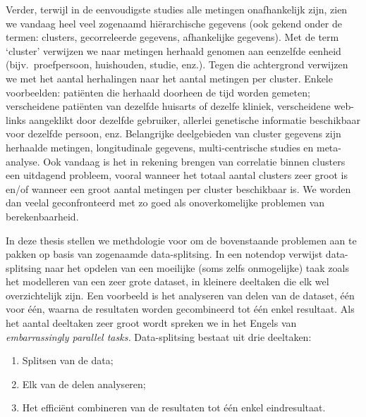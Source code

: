 \documentclass[14pt]{article}
\begin{document}
\begin{sloppypar}
Verder, terwijl in de eenvoudigste studies alle metingen onafhankelijk zijn, zien we vandaag heel veel zogenaamd hi\"erarchische gegevens (ook gekend onder de termen: clusters, gecorreleerde gegevens, afhankelijke gegevens). Met de term `cluster' verwijzen we naar metingen herhaald genomen aan eenzelfde eenheid (bijv.\ proefpersoon, huishouden, studie, enz.). Tegen die achtergrond verwijzen we met het aantal herhalingen naar het aantal metingen per cluster. Enkele voorbeelden: pati\"enten die herhaald doorheen de tijd worden gemeten; verscheidene pati\"enten van dezelfde huisarts of dezelfe kliniek, verscheidene web-links aangeklikt door dezelfde gebruiker, allerlei genetische informatie beschikbaar voor dezelfde persoon, enz. Belangrijke deelgebieden van cluster gegevens zijn herhaalde metingen, longitudinale gegevens, multi-centrische studies en meta-analyse. Ook vandaag is het in rekening brengen van correlatie binnen clusters een uitdagend probleem, vooral wanneer het totaal aantal clusters zeer groot is en/of wanneer een groot aantal metingen per cluster beschikbaar is. We worden dan veelal geconfronteerd met zo goed als onoverkomelijke problemen van berekenbaarheid. 
\end{sloppypar}

\begin{sloppypar}
In deze thesis stellen we methdologie voor om de bovenstaande problemen aan te pakken op basis van zogenaamde data-splitsing. In een notendop verwijst data-splitsing naar het opdelen van een moeilijke (soms zelfs onmogelijke) taak zoals het modelleren van een zeer grote dataset, in kleinere deeltaken die elk wel overzichtelijk zijn. Een voorbeeld is het analyseren van delen van de dataset, \'e\'en voor \'e\'en, waarna de resultaten worden gecombineerd tot \'e\'en enkel resultaat. Als het aantal deeltaken zeer groot wordt spreken we in het Engels van {\em embarrassingly parallel tasks.} Data-splitsing bestaat uit drie deeltaken:
\begin{enumerate}
\item Splitsen van de data;
\item Elk van de delen analyseren;
\item Het effici\"ent combineren van de resultaten tot \'e\'en enkel eindresultaat. 
\end{enumerate}
\end{sloppypar}
\end{document}
